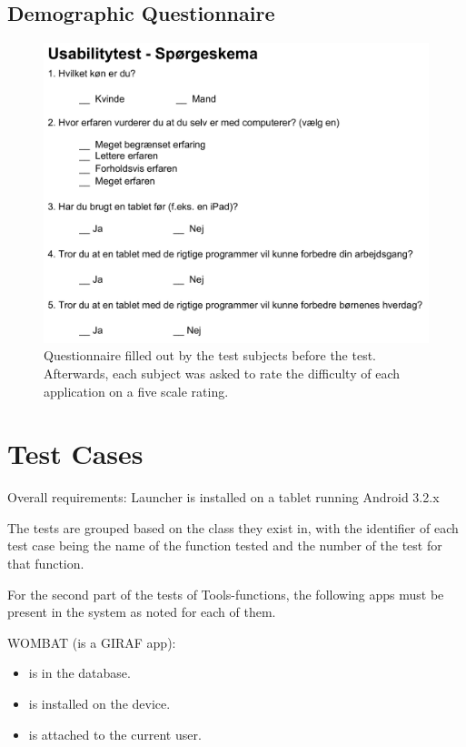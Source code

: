 \section{Demographic Questionnaire}
\begin{figure}[h!]
	\centering
	\includegraphics[scale=0.7]{gfx/usability-questionnaire.png}
	\caption{Questionnaire filled out by the test subjects before the test. Afterwards, each subject was asked to rate the difficulty of each application on a five scale rating.}
	\label{fig:usability_questionnaire}
\end{figure}

\chapter{Test Cases}
\label{test_cases}
Overall requirements: \newline
Launcher is installed on a tablet running Android 3.2.x \newline

The tests are grouped based on the class they exist in, with the identifier of each test case being the name of the function tested and the number of the test for that function. \newline

For the second part of the tests of Tools-functions, the following apps must be present in the system as noted for each of them. \newline

WOMBAT (is a GIRAF app):
\begin{itemize}
\item is in the database.
\item is installed on the device.
\item is attached to the current user.
\end{itemize}

